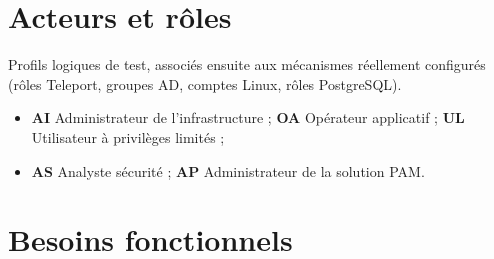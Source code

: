 \documentclass[11pt,a4paper]{report}
\begin{document}
\section{Acteurs et rôles}
Profils logiques de test, associés ensuite aux mécanismes réellement configurés (rôles Teleport, groupes AD, comptes Linux, rôles PostgreSQL).
\begin{itemize}
\item \textbf{AI} Administrateur de l'infrastructure ; \textbf{OA} Opérateur applicatif ; \textbf{UL} Utilisateur à privilèges limités ;
\item \textbf{AS} Analyste sécurité ; \textbf{AP} Administrateur de la solution PAM.
\end{itemize}

\section{Besoins fonctionnels}
\footnotesize
\end{document}
